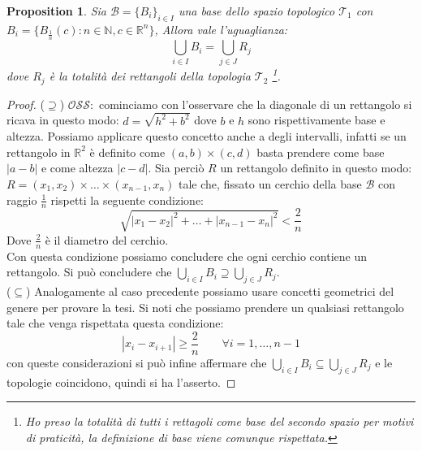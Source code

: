 \documentclass{article}
\newtheorem{proposition}{Proposition}
\begin{document}
        \begin{proposition}
            Sia $\mathcal{B} = \{ B_i \}_{i\in I}$ una base dello spazio topologico $\mathcal{T}_1$ con \\ $B_i = \{ B_\frac{1}{n}(c) : n \in \mathbb{N}, c \in \mathbb{R}^n \}$, Allora vale l'uguaglianza:
            \begin{equation*}
                \bigcup_{i \in I} B_i = \bigcup_{j\in J} R_j
            \end{equation*}
            dove $R_j$ è la totalità dei rettangoli della topologia $\mathcal{T}_2$ \footnote{Ho preso la totalità di tutti i rettagoli come base del secondo spazio per motivi di praticità, la definizione di base viene comunque rispettata.}.
        \end{proposition}
        \begin{proof}
            ($\supseteq $) $\mathcal{OSS:}$ cominciamo con l'osservare che la diagonale di un rettangolo si ricava in questo modo: $d = \sqrt{h^2 + b^2}$ dove $b$ e $h$ sono rispettivamente base e altezza.
            Possiamo applicare questo concetto anche a degli intervalli, infatti se un rettangolo in $\mathbb{R}^2$ è definito come $(a,b) \times (c,d)$ basta prendere come base $\left\lvert a - b \right\rvert$ e come altezza $\left\lvert c - d \right\rvert$.
            Sia perciò $R$ un rettangolo definito in questo modo: $R = (x_1,x_2)\times \dots \times (x_{n-1},x_n)$ tale che, fissato un cerchio della base $\mathcal{B}$ con raggio $\frac{1}{n}$ rispetti la seguente condizione:
            \begin{equation*}
                \sqrt{{\left\lvert x_1 - x_2 \right\rvert}^2 + \dots + {\left\lvert x_{n-1} - x_n \right\rvert}^2} < \frac{2}{n}
            \end{equation*}
            Dove $\frac{2}{n}$ è il diametro del cerchio. \\ 
            Con questa condizione possiamo concludere che ogni cerchio contiene un rettangolo. Si può concludere che $\bigcup_{i \in I} B_i \supseteq \bigcup_{j\in J} R_j.$ \\
            ($\subseteq$) Analogamente al caso precedente possiamo usare concetti geometrici del genere per provare la tesi.
            Si noti che possiamo prendere un qualsiasi rettangolo tale che venga rispettata questa condizione: 
            \begin{equation*}
                \left\lvert x_i - x_{i + 1} \right\rvert \geq \frac{2}{n} \qquad \forall i = 1,\dots , n - 1
            \end{equation*}
            con queste considerazioni si può infine affermare che $\bigcup_{i \in I} B_i \subseteq \bigcup_{j\in J} R_j$ e le topologie coincidono, quindi si ha l'asserto.
         \end{proof}
\end{document}

